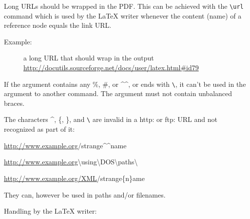 \documentclass[a4paper]{article}
\newenvironment{DUlineblock}[1]{%
    \list{}{\setlength{\partopsep}{\parskip}
            \addtolength{\partopsep}{\baselineskip}
            \setlength{\topsep}{0pt}
            \setlength{\itemsep}{0.15\baselineskip}
            \setlength{\parsep}{0pt}
            \setlength{\leftmargin}{#1}}
    \raggedright
  }
  {\endlist}
\begin{document}
Long URLs should be wrapped in the PDF. This can be achieved with the
\texttt{\textbackslash{}url} command which is used by the LaTeX writer whenever the content
(name) of a reference node equals the link URL.

\begin{description}
\item[{Example:}] 
a long URL that should wrap in the output
\url{http://docutils.sourceforge.net/docs/user/latex.html\#id79}

\end{description}

If the argument contains any \textquotedbl{}\%\textquotedbl{}, \textquotedbl{}\#\textquotedbl{}, or \textquotedbl{}\textasciicircum{}\textasciicircum{}\textquotedbl{}, or ends with \texttt{\textbackslash{}}, it can't
be used in the argument to another command. The argument must not contain
unbalanced braces.

The characters \textasciicircum{}, \{, \}, and \texttt{\textbackslash{}} are invalid in a \textquotedbl{}http:\textquotedbl{} or \textquotedbl{}ftp:\textquotedbl{} URL
and not recognized as part of it:

\begin{DUlineblock}{0em}
\item[] \url{http://www.example.org}/strange\textasciicircum{}\textasciicircum{}name
\item[] \url{http://www.example.org}\textbackslash{}using\textbackslash{}DOS\textbackslash{}paths\textbackslash{}
\item[] \url{http://www.example.org/XML}/strange\{n\}ame
\end{DUlineblock}

They can, however be used in paths and/or filenames.

Handling by the LaTeX writer:
\end{document}
